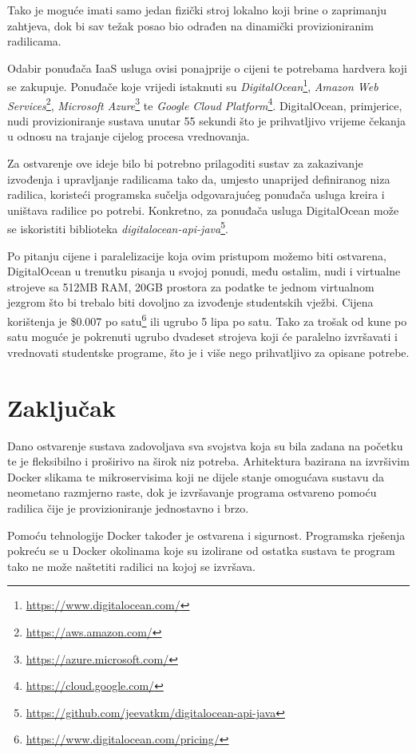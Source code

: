 \documentclass[times, utf8, zavrsni]{fer}
\begin{document}
{{{Tako je moguće imati samo jedan fizički stroj lokalno koji brine o zaprimanju zahtjeva, dok bi sav težak posao bio odrađen na dinamički provizioniranim radilicama.

Odabir ponuđača IaaS usluga ovisi ponajprije o cijeni te potrebama hardvera koji se zakupuje. Ponuđače koje vrijedi istaknuti su {\textit{DigitalOcean}}{\footnote{\url{https://www.digitalocean.com/}}}, {\textit{Amazon Web Services}}{\footnote{\url{https://aws.amazon.com/}}}, {\textit{Microsoft Azure}}{\footnote{\url{https://azure.microsoft.com/}}} te {\textit{Google Cloud Platform}}{\footnote{\url{https://cloud.google.com/}}}. DigitalOcean, primjerice, nudi provizioniranje sustava unutar 55 sekundi što je prihvatljivo vrijeme čekanja u odnosu na trajanje cijelog procesa vrednovanja.

Za ostvarenje ove ideje bilo bi potrebno prilagoditi sustav za zakazivanje izvođenja i upravljanje radilicama tako da, umjesto unaprijed definiranog niza radilica, koristeći programska sučelja odgovarajućeg ponuđača usluga kreira i uništava radilice po potrebi. Konkretno, za ponuđača usluga DigitalOcean može se iskoristiti biblioteka {\textit{digitalocean-api-java}}{\footnote{\url{https://github.com/jeevatkm/digitalocean-api-java}}}.

Po pitanju cijene i paralelizacije koja ovim pristupom možemo biti ostvarena, DigitalOcean u trenutku pisanja u svojoj ponudi, među ostalim, nudi i virtualne strojeve sa 512MB RAM, 20GB prostora za podatke te jednom virtualnom jezgrom što bi trebalo biti dovoljno za izvođenje studentskih vježbi. Cijena korištenja je \$0.007 po satu{\footnote{\url{https://www.digitalocean.com/pricing/}}} ili ugrubo 5 lipa po satu. Tako za trošak od kune po satu moguće je pokrenuti ugrubo dvadeset strojeva koji će paralelno izvršavati i vrednovati studentske programe, što je i više nego prihvatljivo za opisane potrebe.


\chapter{Zaključak}

Dano ostvarenje sustava zadovoljava sva svojstva koja su bila zadana na početku te je fleksibilno i proširivo na širok niz potreba. Arhitektura bazirana na izvršivim Docker slikama te mikroservisima koji ne dijele stanje omogućava sustavu da neometano razmjerno raste, dok je izvršavanje programa ostvareno pomoću radilica čije je provizioniranje jednostavno i brzo.

Pomoću tehnologije Docker također je ostvarena i sigurnost. Programska rješenja pokreću se u Docker okolinama koje su izolirane od ostatka sustava te program tako ne može naštetiti radilici na kojoj se izvršava.

}}}
\end{document}
